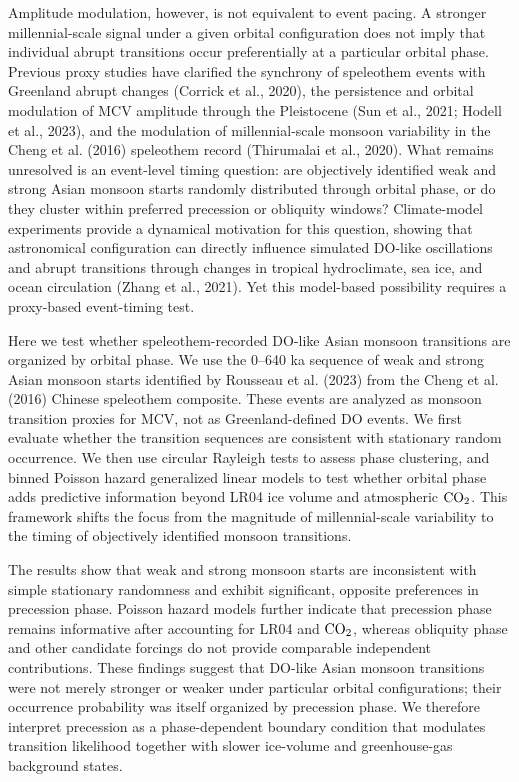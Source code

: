 \documentclass[11pt]{article}
\begin{document}
Amplitude modulation, however, is not equivalent to event pacing. A stronger millennial-scale signal under a given orbital configuration does not imply that individual abrupt transitions occur preferentially at a particular orbital phase. Previous proxy studies have clarified the synchrony of speleothem events with Greenland abrupt changes (Corrick et al., 2020), the persistence and orbital modulation of MCV amplitude through the Pleistocene (Sun et al., 2021; Hodell et al., 2023), and the modulation of millennial-scale monsoon variability in the Cheng et al. (2016) speleothem record (Thirumalai et al., 2020). What remains unresolved is an event-level timing question: are objectively identified weak and strong Asian monsoon starts randomly distributed through orbital phase, or do they cluster within preferred precession or obliquity windows? Climate-model experiments provide a dynamical motivation for this question, showing that astronomical configuration can directly influence simulated DO-like oscillations and abrupt transitions through changes in tropical hydroclimate, sea ice, and ocean circulation (Zhang et al., 2021). Yet this model-based possibility requires a proxy-based event-timing test.

Here we test whether speleothem-recorded DO-like Asian monsoon transitions are organized by orbital phase. We use the 0--640 ka sequence of weak and strong Asian monsoon starts identified by Rousseau et al. (2023) from the Cheng et al. (2016) Chinese speleothem composite. These events are analyzed as monsoon transition proxies for MCV, not as Greenland-defined DO events. We first evaluate whether the transition sequences are consistent with stationary random occurrence. We then use circular Rayleigh tests to assess phase clustering, and binned Poisson hazard generalized linear models to test whether orbital phase adds predictive information beyond LR04 ice volume and atmospheric \(\ce{CO2}\). This framework shifts the focus from the magnitude of millennial-scale variability to the timing of objectively identified monsoon transitions.

The results show that weak and strong monsoon starts are inconsistent with simple stationary randomness and exhibit significant, opposite preferences in precession phase. Poisson hazard models further indicate that precession phase remains informative after accounting for LR04 and \(\ce{CO2}\), whereas obliquity phase and other candidate forcings do not provide comparable independent contributions. These findings suggest that DO-like Asian monsoon transitions were not merely stronger or weaker under particular orbital configurations; their occurrence probability was itself organized by precession phase. We therefore interpret precession as a phase-dependent boundary condition that modulates transition likelihood together with slower ice-volume and greenhouse-gas background states.
\end{document}
